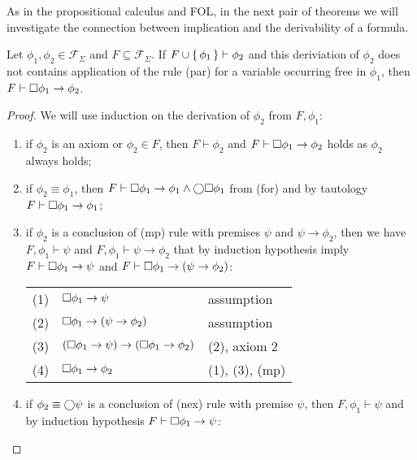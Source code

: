 As in the propositional calculus and \ac{FOL}, in the next pair of theorems we will investigate the connection between
implication and the derivability of a formula.

\begin{theorem}
  Let $\phi_1, \phi_2 \in \mathcal{F}_\Sigma$ and $F \subseteq \mathcal{F}_\Sigma$. If $F \cup \set{\phi_1} \vdash
  \phi_2$ and this deriviation of $\phi_2$ does not contains application of the rule (par) for a variable occurring free
  in $\phi_1$, then $F \vdash \Box{\phi_1} \to \phi_2$.
\end{theorem}
\begin{proof}
  We will use induction on the derivation of $\phi_2$ from $F, \phi_1$:
  \begin{enumerate}
    \item if $\phi_2$ is an axiom or $\phi_2 \in F$, then $F \vdash \phi_2$ and $F \vdash \Box{\phi_1} \to \phi_2$ holds as
      $\phi_2$ always holds;
    \item if $\phi_2 \equiv \phi_1$, then $F \vdash \Box{\phi_1} \to \phi_1 \land \bigcirc{\Box{\phi_1}}$ from
      (for) and by tautology $F \vdash \Box{\phi_1} \to \phi_1$;
    \item if $\phi_2$ is a conclusion of (mp) rule with premises $\psi$ and $\psi \to \phi_2$, then we have $F, \phi_1 \vdash
      \psi$ and $F, \phi_1 \vdash \psi \to \phi_2$ that by induction hypothesis imply $F \vdash \Box{\phi_1} \to \psi$
      and $F \vdash \Box{\phi_1} \to (\psi \to \phi_2)$:

      \begin{tabularx}{300pt}{cXl}
        (1) & $\Box{\phi_1} \to \psi$ & assumption \\
        (2) & $\Box{\phi_1} \to (\psi \to \phi_2)$ & assumption \\
        (3) & $(\Box{\phi_1} \to \psi) \to (\Box{\phi_1} \to \phi_2)$ & (2), axiom 2 \\
        (4) & $\Box{\phi_1} \to \phi_2$ & (1), (3), (mp) \\
      \end{tabularx}
    \item if $\phi_2 \equiv \bigcirc{\psi}$ is a conclusion of (nex) rule with premise $\psi$, then $F, \phi_1 \vdash \psi$
      and by induction hypothesis $F \vdash \Box{\phi_1} \to \psi$:


\end{enumerate}
\end{proof}
